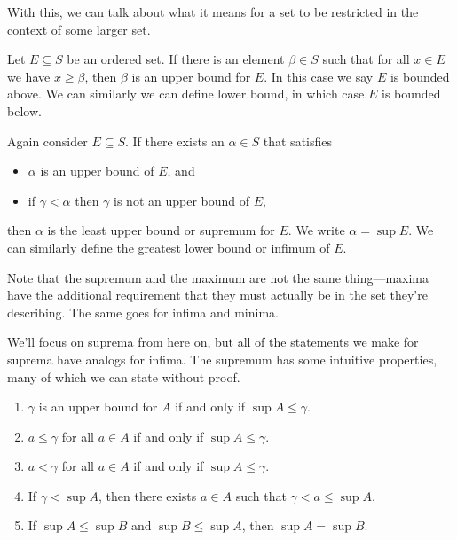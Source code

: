 \documentclass[../m131main.tex]{subfiles}
\begin{document}
With this, we can talk about what it means for a set to be restricted in the context of some larger set.

\begin{definition}
    Let $E \subseteq S$ be an ordered set.
    If there is an element $\beta \in S$ such that for all $x \in E$ we have $x \geq \beta$, then $\beta$ is an upper bound for $E$.
    In this case we say $E$ is bounded above.
    We can similarly we can define lower bound, in which case $E$ is bounded below.
\end{definition}

\begin{definition}
    Again consider $E \subseteq S$.
    If there exists an $\alpha \in S$ that satisfies
    \begin{itemize}
        \item $\alpha$ is an upper bound of $E$, and
        \item if $\gamma < \alpha$ then $\gamma$ is not an upper bound of $E$,
    \end{itemize}
    then $\alpha$ is the least upper bound or supremum for $E$.
    We write $\alpha = \sup E$.
    We can similarly define the greatest lower bound or infimum of $E$.
\end{definition}

Note that the supremum and the maximum are not the same thing---maxima have the additional requirement that they must actually be in the set they're describing.
The same goes for infima and minima.

We'll focus on suprema from here on, but all of the statements we make for suprema have analogs for infima.
The supremum has some intuitive properties, many of which we can state without proof.

\begin{theorem} \label{sup_props}
    \begin{enumerate}[label=(\alph*)]
        \item $\gamma$ is an upper bound for $A$ if and only if $\sup A \leq \gamma$.
        \item $a \leq \gamma$ for all $a \in A$ if and only if $\sup A \leq \gamma$.
        \item $a < \gamma$ for all $a \in A$ if and only if $\sup A \leq \gamma$.
        \item If $\gamma < \sup A$, then there exists $a \in A$ such that $\gamma < a \leq \sup A$.
        \item If $\sup A \leq \sup B$ and $\sup B \leq \sup A$, then $\sup A = \sup B$.
    \end{enumerate}
\end{theorem}
\end{document}
